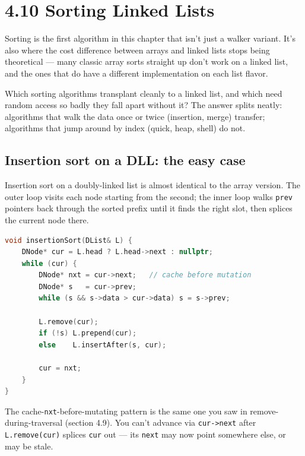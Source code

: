 \documentclass[11pt]{article}
\begin{document}
\section{4.10 Sorting Linked Lists}

Sorting is the first algorithm in this chapter that isn't just a
walker variant. It's also where the cost difference between arrays
and linked lists stops being theoretical --- many classic array
sorts straight up don't work on a linked list, and the ones that
do have a different implementation on each list flavor.

\begin{ideabox}
Which sorting algorithms transplant cleanly to a linked list, and
which need random access so badly they fall apart without it? The
answer splits neatly: algorithms that walk the data once or twice
(insertion, merge) transfer; algorithms that jump around by index
(quick, heap, shell) do not.
\end{ideabox}

\subsection*{Insertion sort on a DLL: the easy case}

Insertion sort on a doubly-linked list is almost identical to the
array version. The outer loop visits each node starting from the
second; the inner loop walks \texttt{prev} pointers back through
the sorted prefix until it finds the right slot, then splices the
current node there.

\begin{examplebox}
\begin{lstlisting}[language=C++,basicstyle=\ttfamily\small,frame=single]
void insertionSort(DList& L) {
    DNode* cur = L.head ? L.head->next : nullptr;
    while (cur) {
        DNode* nxt = cur->next;   // cache before mutation
        DNode* s   = cur->prev;
        while (s && s->data > cur->data) s = s->prev;

        L.remove(cur);
        if (!s) L.prepend(cur);
        else    L.insertAfter(s, cur);

        cur = nxt;
    }
}
\end{lstlisting}
\end{examplebox}

The cache-\texttt{nxt}-before-mutating pattern is the same one you
saw in remove-during-traversal (section 4.9). You can't advance
via \texttt{cur->next} after \texttt{L.remove(cur)} splices
\texttt{cur} out --- its \texttt{next} may now point somewhere
else, or may be stale.
\end{document}
